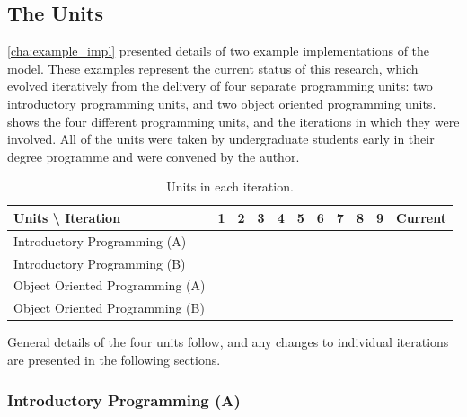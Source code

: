\subsection{The Units} %
\label{sub:the_units}

\cref{cha:example_impl} presented details of two example implementations of the model. These examples represent the current status of this research, which evolved iteratively from the delivery of four separate programming units: two introductory programming units, and two object oriented programming units.  shows the four different programming units, and the iterations in which they were involved. All of the units were taken by undergraduate students early in their degree programme and were convened by the author. 

\begin{table}[htb]
  \footnotesize
  \renewcommand{\arraystretch}{1.3}
  \caption{Units in each iteration.}
  \label{tbl:units_iteration}
  \centering
	\begin{tabular}{l|c|c|c|c|c|c|c|c|c|c}
		Units \textbackslash{} Iteration & 1 & 2 & 3 & 4 & 5 & 6 & 7 & 8 & 9 & Current \\ \hline
		Introductory Programming (A) & \checkmark & ~ & \checkmark & ~           & \checkmark & \checkmark & ~           & \checkmark & ~ & \checkmark           \\ 
		Introductory Programming (B)    & ~           & ~           & ~           & ~           & ~           & ~           & \checkmark & \checkmark & \checkmark & \checkmark \\ \hline
		Object Oriented Programming (A) & ~           & \checkmark & ~           & \checkmark & ~           & ~           & \checkmark & ~           & \checkmark & \checkmark \\ 
		Object Oriented Programming (B) & ~           & ~           & ~           & ~           & ~           & ~           & ~           & ~           & \checkmark & \checkmark
	\end{tabular}
\end{table}

General details of the four units follow, and any changes to individual iterations are presented in the following sections.

\subsubsection{Introductory Programming (A)} %
\label{ssub:introductory_programming_a}

